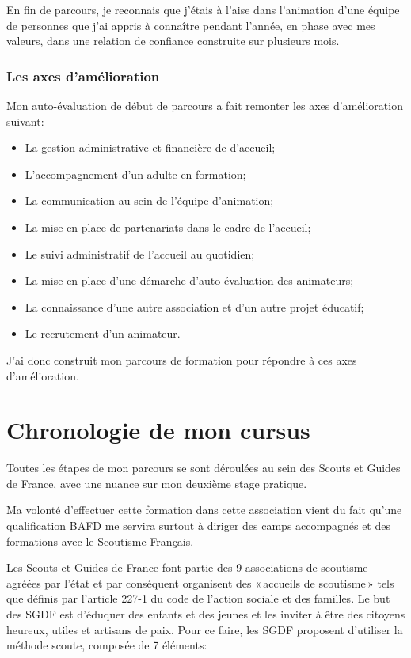 \documentclass[titlepage,11pt,a4paper]{article}
\begin{document}
En fin de parcours, je reconnais que j'étais à l'aise dans l'animation d'une équipe
de personnes que j'ai appris à connaître pendant l'année, en phase avec mes valeurs,
dans une relation de confiance construite sur plusieurs mois.

\subsubsection{Les axes d'amélioration}

Mon auto-évaluation de début de parcours a fait remonter les axes d'amélioration suivant:

\begin{itemize}
   \item La gestion administrative et financière de d'accueil;
   \item L'accompagnement d'un adulte en formation;
   \item La communication au sein de l'équipe d'animation;
   \item La mise en place de partenariats dans le cadre de l'accueil;
   \item Le suivi administratif de l'accueil au quotidien;
   \item La mise en place d'une démarche d'auto-évaluation des animateurs;
   \item La connaissance d'une autre association et d'un autre projet éducatif;
   \item Le recrutement d'un animateur.
\end{itemize}

J'ai donc construit mon parcours de formation pour répondre à ces axes d'amélioration.

\section{Chronologie de mon cursus}

Toutes les étapes de mon parcours se sont déroulées au sein des Scouts et Guides de
France, avec une nuance sur mon deuxième stage pratique.

Ma volonté d'effectuer cette formation dans cette association vient du fait qu'une
qualification BAFD me servira surtout à diriger des camps accompagnés et des formations
avec le Scoutisme Français.

Les Scouts et Guides de France font partie des 9 associations de scoutisme agréées par
l'état et par conséquent organisent des «\,accueils de scoutisme\,» tels que définis par
l'article 227-1 du code de l'action sociale et des familles. Le but des SGDF est d'éduquer
des enfants et des jeunes et les inviter à être des citoyens heureux, utiles et artisans
de paix. Pour ce faire, les SGDF proposent d'utiliser la méthode scoute, composée de 7
éléments:
\end{document}
